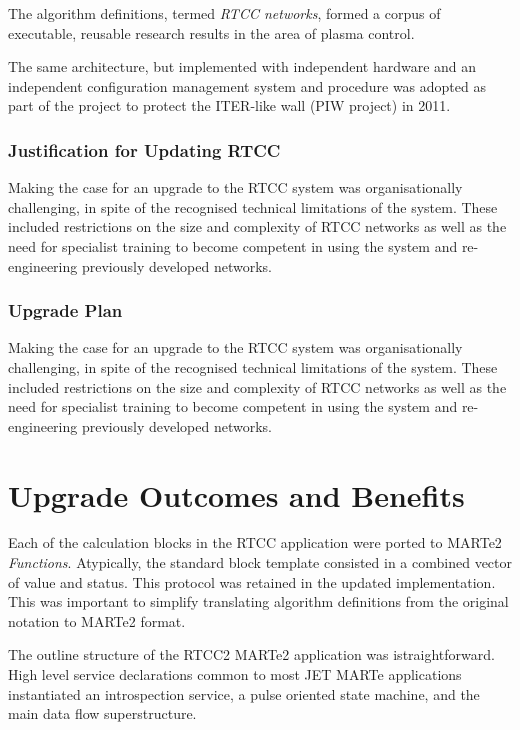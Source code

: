 \documentclass[preprint,12pt]{elsarticle}
\begin{document}
The algorithm definitions, termed {\em RTCC networks}, formed a corpus
of executable, reusable research results in the area of plasma control.

The same architecture, but implemented with independent hardware
and an independent configuration management system and procedure 
was adopted as part of the project to protect the ITER-like wall
(PIW project) in 2011.

\subsubsection{Justification for Updating RTCC}

Making the case for an upgrade to the RTCC system was organisationally
challenging, in spite of the recognised technical limitations of the system.
These included restrictions on the size and complexity of RTCC networks
as well as the need for specialist training to become competent in
using the system and re-engineering previously developed networks.

\subsubsection{Upgrade Plan}

Making the case for an upgrade to the RTCC system was organisationally
challenging, in spite of the recognised technical limitations of the system.
These included restrictions on the size and complexity of RTCC networks
as well as the need for specialist training to become competent in
using the system and re-engineering previously developed networks.



\section{Upgrade Outcomes and Benefits}

Each of the calculation blocks in the RTCC application were ported to MARTe2 {\em Functions}.
Atypically, the standard block template consisted in a combined vector of value and status.
This protocol was retained in the updated implementation. This was important to simplify
translating algorithm definitions from the original notation to MARTe2 format.

The outline structure of the RTCC2 MARTe2 application was istraightforward.
High level service declarations common to most JET MARTe applications
instantiated an introspection service, a pulse oriented state machine, 
and the main data flow superstructure.
\end{document}
